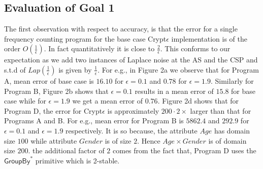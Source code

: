 \subsection{Evaluation of Goal 1}
The first observation with respect to accuracy, is that the error for a single frequency counting program for the base case Crypt$\epsilon$ implementation is of the order $O(\frac{1}{\epsilon})$. In fact quantitatively it is close to $\frac{2}{\epsilon}$. This conforms to our expectation as we add two instances of Laplace noise at the \textsf{AS} and the \textsf{CSP} and s.t.d of $Lap(\frac{1}{\epsilon})$ is given by $\frac{1}{\epsilon}$. For e.g., in Figure 2a we observe that for Program A, mean error of base case \system is $16.10$ for $\epsilon=0.1$ and $0.78$ for $\epsilon=1.9$. Similarly for Program B, Figure 2b shows that  $\epsilon=0.1$ results in a mean error of $15.8$ for base case \system while for $\epsilon=1.9$ we get a mean error of $0.76$. Figure 2d shows that  for Program D, the  error for Crypt$\epsilon$ is approximately $200\cdot 2 \times $ larger than that for Programs A and B. For e.g., mean error for Program B is $5862.4$ and $292.9$ for $\epsilon=0.1$ and $\epsilon=1.9$ respectively. It is so because, the attribute $Age$ has domain size $100$ while attribute $Gender$ is of size $2$. Hence $Age\times Gender$ is of domain size $200$. the additional factor of $2$ comes from the fact that, Program D uses the $\textsf{GroupBy}^*$ primitive which is 2-stable.  
 \par 
